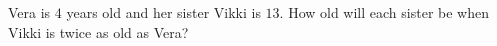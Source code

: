 Vera is $4$ years old and her sister Vikki is $13$. How old will each sister be when Vikki is twice as old as Vera?
